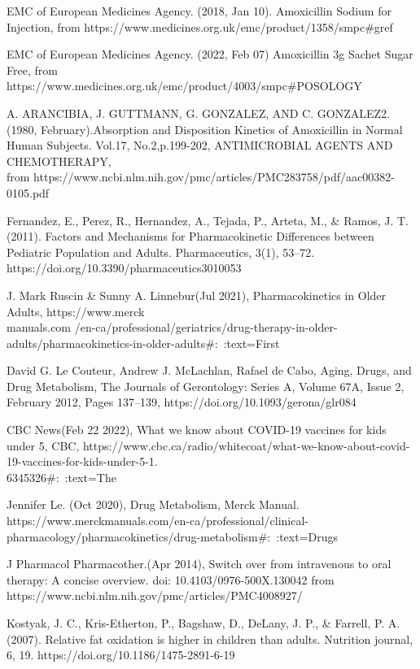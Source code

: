 \documentclass{article}
\begin{document}
EMC of European Medicines Agency. (2018, Jan 10). Amoxicillin Sodium for Injection, from https://www.medicines.org.uk/emc/product/1358/smpc#gref

EMC of European Medicines Agency. (2022, Feb 07) Amoxicillin 3g Sachet Sugar Free, from https://www.medicines.org.uk/emc/product/4003/smpc#POSOLOGY

A. ARANCIBIA, J. GUTTMANN, G. GONZALEZ, AND C. GONZALEZ2. (1980, February).Absorption and Disposition Kinetics of Amoxicillin in Normal Human Subjects. Vol.17, No.2,p.199-202, ANTIMICROBIAL AGENTS AND CHEMOTHERAPY, \\
from https://www.ncbi.nlm.nih.gov/pmc/articles/PMC283758/pdf/aac00382-0105.pdf

Fernandez, E., Perez, R., Hernandez, A., Tejada, P., Arteta, M., & Ramos, J. T. (2011). Factors and Mechanisms for Pharmacokinetic Differences between Pediatric Population and Adults. Pharmaceutics, 3(1), 53–72. https://doi.org/10.3390/pharmaceutics3010053

J. Mark Ruscin & Sunny A. Linnebur(Jul 2021), Pharmacokinetics in Older Adults, https://www.merck \\manuals.com /en-ca/professional/geriatrics/drug-therapy-in-older-adults/pharmacokinetics-in-older-adults#:~:text=First%

David G. Le Couteur, Andrew J. McLachlan, Rafael de Cabo, Aging, Drugs, and Drug Metabolism, The Journals of Gerontology: Series A, Volume 67A, Issue 2, February 2012, Pages 137–139, https://doi.org/10.1093/gerona/glr084

CBC News(Feb 22 2022), What we know about COVID-19 vaccines for kids under 5, CBC, https://www.cbc.ca/radio/whitecoat/what-we-know-about-covid-19-vaccines-for-kids-under-5-1.\\6345326#:~:text=The%

Jennifer Le. (Oct 2020), Drug Metabolism, Merck Manual. https://www.merckmanuals.com/en-ca/professional/clinical-pharmacology/pharmacokinetics/drug-metabolism#:~:text=Drugs%

J Pharmacol Pharmacother.(Apr 2014), Switch over from intravenous to oral therapy: A concise overview. doi: 10.4103/0976-500X.130042 from https://www.ncbi.nlm.nih.gov/pmc/articles/PMC4008927/

Kostyak, J. C., Kris-Etherton, P., Bagshaw, D., DeLany, J. P., & Farrell, P. A. (2007). Relative fat oxidation is higher in children than adults. Nutrition journal, 6, 19. https://doi.org/10.1186/1475-2891-6-19
\end{document}
